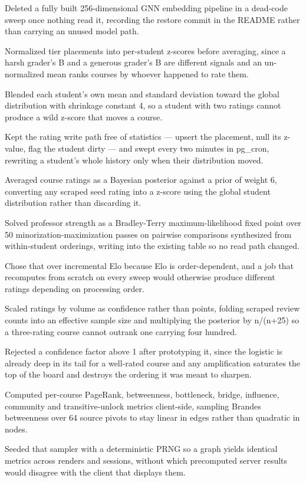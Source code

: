 \documentclass[letterpaper,11pt]{article}
\newcommand{\resumeItem}[1]{
  \item\small{
    {#1 \vspace{-2pt}}
  }
}
\begin{document}
            \resumeItem{Deleted a fully built 256-dimensional GNN embedding pipeline in a dead-code sweep once nothing read it, recording the restore commit in the README rather than carrying an unused model path.}
            \resumeItem{Normalized tier placements into per-student z-scores before averaging, since a harsh grader's B and a generous grader's B are different signals and an un-normalized mean ranks courses by whoever happened to rate them.}
            \resumeItem{Blended each student's own mean and standard deviation toward the global distribution with shrinkage constant 4, so a student with two ratings cannot produce a wild z-score that moves a course.}
            \resumeItem{Kept the rating write path free of statistics --- upsert the placement, null its z-value, flag the student dirty --- and swept every two minutes in pg\_cron, rewriting a student's whole history only when their distribution moved.}
            \resumeItem{Averaged course ratings as a Bayesian posterior against a prior of weight 6, converting any scraped seed rating into a z-score using the global student distribution rather than discarding it.}
            \resumeItem{Solved professor strength as a Bradley-Terry maximum-likelihood fixed point over 50 minorization-maximization passes on pairwise comparisons synthesized from within-student orderings, writing into the existing table so no read path changed.}
            \resumeItem{Chose that over incremental Elo because Elo is order-dependent, and a job that recomputes from scratch on every sweep would otherwise produce different ratings depending on processing order.}
            \resumeItem{Scaled ratings by volume as confidence rather than points, folding scraped review counts into an effective sample size and multiplying the posterior by n/(n+25) so a three-rating course cannot outrank one carrying four hundred.}
            \resumeItem{Rejected a confidence factor above 1 after prototyping it, since the logistic is already deep in its tail for a well-rated course and any amplification saturates the top of the board and destroys the ordering it was meant to sharpen.}
            \resumeItem{Computed per-course PageRank, betweenness, bottleneck, bridge, influence, community and transitive-unlock metrics client-side, sampling Brandes betweenness over 64 source pivots to stay linear in edges rather than quadratic in nodes.}
            \resumeItem{Seeded that sampler with a deterministic PRNG so a graph yields identical metrics across renders and sessions, without which precomputed server results would disagree with the client that displays them.}
\end{document}
